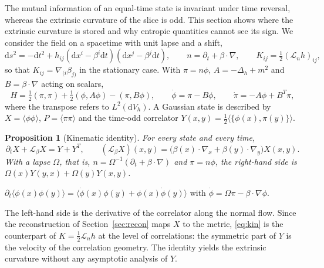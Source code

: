 \documentclass[11pt,a4paper]{article}
\makeatletter
\theoremstyle{stmt}
\newtheorem{proposition}[theorem]{Proposition}
\theoremstyle{defn}
\theoremstyle{rmk}
\renewenvironment{proof}[1][\proofname]{\par\pushQED{\qed}\normalfont\topsep6\p@\@plus6\p@\relax
  \trivlist\item[\hskip\labelsep{\sffamily\itshape\small #1.}]\ignorespaces}{\popQED\endtrivlist\@endpefalse}
\numberwithin{equation}{section}
\newcommand{\dd}{\mathrm{d}}
\makeatother
\begin{document}
The mutual information of an equal-time state is invariant under time reversal, whereas the extrinsic curvature of the slice is odd. This section shows where the extrinsic curvature is stored and why entropic quantities cannot see its sign. We consider the field on a spacetime with unit lapse and a shift,
\begin{equation}
\dd s^2=-\dd t^2+h_{ij}(\dd x^i-\beta^i\dd t)(\dd x^j-\beta^j\dd t),\qquad n=\partial_t+\beta\cdot\nabla,\qquad K_{ij}=\tfrac12(\mathcal L_nh)_{ij},
\end{equation}
so that $K_{ij}=\nabla_{(i}\beta_{j)}$ in the stationary case. With $\pi=n\phi$, $A=-\Delta_h+m^2$ and $B=\beta\cdot\nabla$ acting on scalars,
\begin{equation}\label{eq:Hshift}
H=\tfrac12(\pi,\pi)+\tfrac12(\phi,A\phi)-(\pi,B\phi),\qquad\dot\phi=\pi-B\phi,\qquad\dot\pi=-A\phi+B^{T}\pi ,
\end{equation}
where the transpose refers to $L^2(\dd V_h)$. A Gaussian state is described by $X=\langle\phi\phi\rangle$, $P=\langle\pi\pi\rangle$ and the time-odd correlator $Y(x,y)=\tfrac12\langle\{\phi(x),\pi(y)\}\rangle$.

\begin{proposition}[Kinematic identity]\label{prop:kin}
For every state and every time,
\begin{equation}\label{eq:kin}
\partial_tX+\mathcal L_\beta X=Y+Y^{T},\qquad(\mathcal L_\beta X)(x,y)=\big(\beta(x)\cdot\nabla_x+\beta(y)\cdot\nabla_y\big)X(x,y).
\end{equation}
With a lapse $\Omega$, that is, $n=\Omega^{-1}(\partial_t+\beta\cdot\nabla)$ and $\pi=n\phi$, the right-hand side is $\Omega(x)Y(y,x)+\Omega(y)Y(x,y)$.
\end{proposition}

\begin{proof}
$\partial_t\langle\phi(x)\phi(y)\rangle=\langle\dot\phi(x)\phi(y)+\phi(x)\dot\phi(y)\rangle$ with $\dot\phi=\Omega\pi-\beta\cdot\nabla\phi$.
\end{proof}

The left-hand side is the derivative of the correlator along the normal flow. Since the reconstruction of Section~\ref{sec:recon} maps $X$ to the metric, \eqref{eq:kin} is the counterpart of $K=\tfrac12\mathcal L_nh$ at the level of correlations: the symmetric part of $Y$ is the velocity of the correlation geometry. The identity yields the extrinsic curvature without any asymptotic analysis of $Y$.
\end{document}
